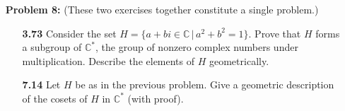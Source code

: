 \documentclass[11pt, one side]{article}
\newcommand{\C}{\mathbb C}
\begin{document}
\begin{enumerate}
\pagebreak

\item[{\bf Problem 8:}] (These two exercises together constitute a single problem.)
\begin{enumerate}
\item[{\bf 3.73}] Consider the set $H = \{a+bi\in \C\,|\, a^2 + b^2 = 1\}$. Prove that $H$ forms a subgroup of $\C^*$, the group of nonzero complex numbers under multiplication.  Describe the elements of $H$ geometrically.




\pagebreak

\item[{\bf 7.14}] Let $H$ be as in the previous problem. Give a geometric description  of the cosets of $H$ in $\C^*$ (with proof).\\
\end {enumerate}

\end {enumerate}
\end{document}
